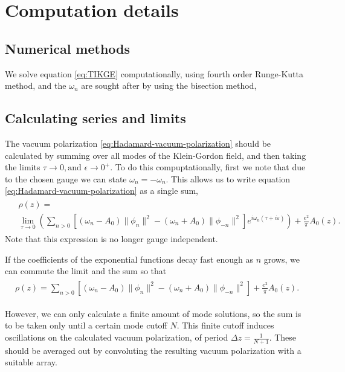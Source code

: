 \chapter{Computation details}

\section{Numerical methods}
We solve equation \eqref{eq:TIKGE} computationally, using fourth order Runge-Kutta method, and the $\omega_n$ are sought after by using the bisection method, 

\section{Calculating series and limits}

The vacuum polarization \eqref{eq:Hadamard-vacuum-polarization} should be calculated by summing over all modes of the Klein-Gordon field, and then taking the limits $\tau\to 0, \text{and } \epsilon \to 0^+$. To do this compuptationally, first we note that due to the chosen gauge we can state $\omega_n =-\omega_{n}$. This allows us to write equation \eqref{eq:Hadamard-vacuum-polarization} as a single sum, 
\begin{align}
	\begin{split}
			&\rho(z) =  \\
			&\lim_{\tau \to 0}\left(
			\sum_{n> 0}^{}\left[ (\omega_n - A_0) \|\phi_n\|^2   -
		(\omega_{n} + A_0) \|\phi_{-n}\|^2 \right]e^{i \omega_n (\tau + i\varepsilon)}  \right)
			+ \frac{e^2}{\pi} A_0(z).
	\end{split}
\end{align}
Note that this expression is no longer gauge independent.

If the coefficients of the exponential functions decay fast enough as $n$ grows, we can commute the limit and the sum so that 
\begin{align}
	\begin{split}
			\rho(z) =  
			\sum_{n> 0}^{}\left[ (\omega_n - A_0) \|\phi_n\|^2   -
		(\omega_{n} + A_0) \|\phi_{-n}\|^2 \right]
			+ \frac{e^2}{\pi} A_0(z).
	\end{split}
\end{align}

However, we can only calculate a finite amount of mode solutions, so the sum is to be taken only until a certain mode cutoff $N$. This finite cutoff induces oscillations on the calculated vacuum polarization, of period $\Delta z = \frac{1}{N+1}$. These should be averaged out by convoluting the resulting vacuum polarization with a suitable array.
